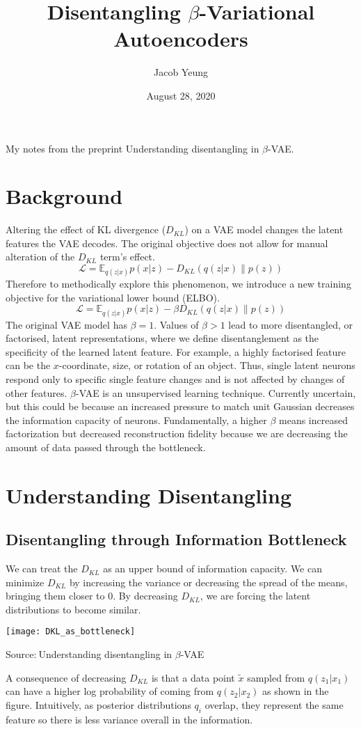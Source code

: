 \documentclass{article}
\title{Disentangling $\beta$-Variational Autoencoders}
\author{Jacob Yeung}
\date{August 28, 2020}
\begin{document}
\maketitle

My notes from the preprint Understanding disentangling in $\beta$-VAE.

\section{Background}
Altering the effect of KL divergence ($D_{KL}$) on a VAE model changes the latent features the VAE decodes. The original objective does not allow for manual alteration of the $D_{KL}$ term's effect.
\begin{equation}\label{original ELBO}
    \mathcal{L}= \mathbb{E}_{q(z|x)}p(x|z) -D_{KL}(q(z|x)\parallel p(z))
\end{equation}
Therefore to methodically explore this phenomenon, we introduce a new training objective for the variational lower bound (ELBO).
\begin{equation}\label{ELBO w/o C}
    \mathcal{L}= \mathbb{E}_{q(z|x)}p(x|z) -\beta D_{KL}(q(z|x)\parallel p(z))
\end{equation}
The original VAE model has $\beta=1$. Values of $\beta > 1$ lead to more disentangled, or factorised, latent representations, where we define disentanglement as the specificity of the learned latent feature. For example, a highly factorised feature can be the $x$-coordinate, size, or rotation of an object. Thus, single latent neurons respond only to specific single feature changes and is not affected by changes of other features. $\beta$-VAE is an unsupervised learning technique. Currently uncertain, but this could be because an increased pressure to match unit Gaussian decreases the information capacity of neurons. Fundamentally, a higher $\beta$ means increased factorization but decreased reconstruction fidelity because we are decreasing the amount of data passed through the bottleneck.

\section{Understanding Disentangling}
\subsection{Disentangling through Information Bottleneck}
We can treat the $D_{KL}$ as an upper bound of information capacity. We can minimize $D_{KL}$ by increasing the variance or decreasing the spread of the means, bringing them closer to 0. By decreasing $D_{KL}$, we are forcing the latent distributions to become similar.
\begin{center}
    \texttt{[image: DKL\_as\_bottleneck]}
    \caption{Source:$~$Understanding disentangling in $\beta$-VAE}
\end{center}
A consequence of decreasing $D_{KL}$ is that a data point $\tilde{x}$ sampled from $q(z_1|x_1)$ can have a higher log probability of coming from $q(z_2|x_2)$ as shown in the figure. Intuitively, as posterior distributions $q_i$ overlap, they represent the same feature so there is less variance overall in the information.
\end{document}
